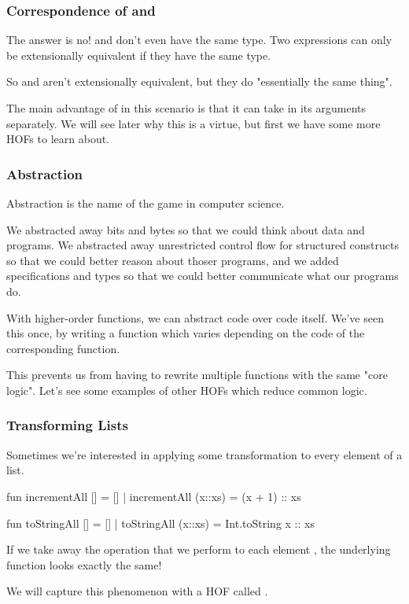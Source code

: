 \documentclass[aspectratio=169]{beamer}
\begin{document}
\begin{frame}[fragile]
  \frametitle{Correspondence of  and }

  The answer is no!  and  don't even have the same type. 
  Two expressions can only be extensionally equivalent if they have the same type.

  So  and  aren't extensionally equivalent, but they do
  "essentially the same thing".

  The main advantage of  in this scenario is that it can take in its
  arguments separately. We will see later why this is a virtue, but first we have
  some more HOFs to learn about.
\end{frame}


\begin{frame}[fragile]
  \frametitle{Abstraction}

  Abstraction is the name of the game in computer science.

  We abstracted away bits and bytes so that we could think about data and programs.
  We abstracted away unrestricted control flow for structured constructs so that
  we could better reason about thoser programs, and we added specifications and types
  so that we could better communicate what our programs do.

  With higher-order functions, we can abstract code over code itself. We've seen this
  once, by writing a  function which varies depending on the code of the 
  corresponding  function.

  This prevents us from having to rewrite multiple  functions with the 
  same "core logic". Let's see some examples of other HOFs which reduce common logic.
\end{frame}

\begin{frame}[fragile]
  \frametitle{Transforming Lists}

  Sometimes we're interested in applying some transformation to every element of a list.

  \begin{codeblock}
    fun incrementAll [] = []
      | incrementAll (x::xs) = (x + 1) :: xs

    fun toStringAll [] = [] 
      | toStringAll (x::xs) = Int.toString x :: xs 
  \end{codeblock}

  If we take away the operation that we perform to each element , the underlying
  function looks exactly the same! 

  We will capture this phenomenon with a HOF called .
\end{frame}
\end{document}
